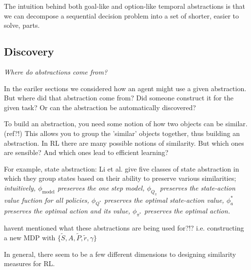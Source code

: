 The intuition behind both goal-like and option-like temporal abstractions is that
we can decompose a sequential decision problem into a set of shorter, easier to solve, parts.

\subsection{Discovery}

\begin{displayquote}
  \textit{Where do abstractions come from?}
\end{displayquote}

In the eariler sections we considered how an agent might use a given abstraction.
But where did that abstraction come from? Did someone construct it for the given task?
Or can the abstraction be automatically discovered?





To build an abstraction, you need some notion of how two objects can be similar. (ref?!)
This allows you to group the 'similar' objects together, thus building an abstraction.
In RL there are many possible notions of similarity. But which ones are sensible?
And which ones lead to efficient learning?

\vspace{5mm}

For example, state abstraction: Li et al. \cite{Littman2006} give five classes of
state abstraction in which they group states based on their ability to preserve various similarities;
\textit{intuitively,
$\phi_{\text{model}}$ preserves the one step model,
$\phi_{Q_{\pi}}$ preserves the state-action value fuction for all policies,
$\phi_{Q^{* }}$ preserves the optimal state-action value,
$\phi_a^{* }$ preserves the optimal action and its value,
$\phi_{\pi^{* }}$ preserves the optimal action.}

{\color{red}havent mentioned what these abstractions are being used for?!?}
i.e. constructing a new MDP with $\{\tilde S, A, \tilde P, \tilde r, \gamma\}$

In general, there seem to be a few different dimensions to designing similarity measures for RL.

